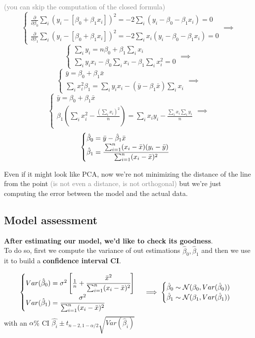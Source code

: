 \textcolor{gray}{(you can skip the computation of the closed formula)}
$$
\begin{cases}
    \frac{\partial}{\partial \beta_0} \sum_{i} (y_i - [\beta_0 + \beta_1 x_i])^2 = -2 \sum_{i} (y_i - \beta_0 - \beta_1 x_i) = 0 \\
    \frac{\partial}{\partial \beta_1} \sum_{i} (y_i - [\beta_0 + \beta_1 x_i])^2 = -2 \sum_{i} x_i (y_i - \beta_0 - \beta_1 x_i) = 0
\end{cases} \implies
$$ $$
\begin{cases}
    \sum_{i} y_i = n\beta_0 + \beta_1 \sum_{i} x_i \\
    \sum_{i} y_i x_i - \beta_0 \sum_{i} x_i - \beta_1 \sum_{i} x_i^2 = 0
\end{cases} \implies
$$ $$
\begin{cases}
\bar{y} = \beta_0 + \beta_1 \bar{x} \\
\sum_{i} x_i^2 \beta_1 = \sum_{i} y_i x_i - (\bar{y} - \beta_1 \bar{x}) \sum_{i} x_i
\end{cases} \implies
$$ $$
\begin{cases}
    \bar{y} = \beta_0 + \beta_1 \bar{x} \\
    \beta_1 \left( \sum_{i} x_i^2 - \frac{(\sum_{i} x_i)^2}{n} \right) = \sum_{i} x_i y_i - \frac{\sum_{i} x_i \sum_{i} y_i}{n}
\end{cases} \implies
$$ $$
\begin{cases}
    \hat{\beta}_0 = \bar{y} - \hat{\beta}_1 \bar{x} \\
\hat{\beta}_1 = \cfrac{\sum_{i=1}^n (x_i - \bar{x})(y_i - \bar{y})}{\sum_{i=1}^n (x_i - \bar{x})^2}
\end{cases}
$$

Even if it might look like PCA, now we're not minimizing the distance of the line from the point
\textcolor{gray}{(is not even a distance, is not orthogonal)} but we're just computing the error 
between the model and the actual data. 

\subsection{Model assessment}
\textbf{After estimating our model, we'd like to check its goodness}.\\
To do so, first we compute the variance of out estimations $\hat{\beta}_0,\hat{\beta}_1$ and then we use it to build a \textbf{confidence interval CI}.

$$
\begin{cases}
Var(\hat{\beta}_0) = \sigma^2 \left[ \frac{1}{n} + \cfrac{\bar{x}^2}{\sum_{i=1}^n (x_i - \bar{x})^2} \right] \\
Var(\hat{\beta}_1) = \cfrac{\sigma^2}{\sum_{i=1}^n (x_i - \bar{x})^2}
\end{cases} \implies
\begin{cases}
\hat{\beta}_0 \sim \mathcal{N}(\beta_0, Var(\hat{\beta}_0)) \\
\hat{\beta}_1 \sim \mathcal{N}(\beta_1, Var(\hat{\beta}_1))
\end{cases}
$$
with an $\alpha$\% CI $\hat{\beta_i}\pm t_{n-2,1-\alpha/2}\sqrt{Var(\hat{\beta}_i)}$

